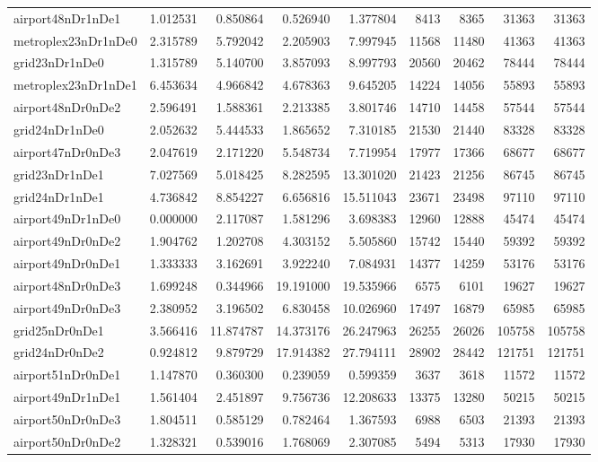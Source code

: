 \begin{longtable}{|l|r|r|r|r|r|r|r|r|}
airport48nDr1nDe1 & 1.012531 & 0.850864 & 0.526940 & 1.377804 & 8413 & 8365 & 31363 & 31363 \\
metroplex23nDr1nDe0 & 2.315789 & 5.792042 & 2.205903 & 7.997945 & 11568 & 11480 & 41363 & 41363 \\
grid23nDr1nDe0 & 1.315789 & 5.140700 & 3.857093 & 8.997793 & 20560 & 20462 & 78444 & 78444 \\
metroplex23nDr1nDe1 & 6.453634 & 4.966842 & 4.678363 & 9.645205 & 14224 & 14056 & 55893 & 55893 \\
airport48nDr0nDe2 & 2.596491 & 1.588361 & 2.213385 & 3.801746 & 14710 & 14458 & 57544 & 57544 \\
grid24nDr1nDe0 & 2.052632 & 5.444533 & 1.865652 & 7.310185 & 21530 & 21440 & 83328 & 83328 \\
airport47nDr0nDe3 & 2.047619 & 2.171220 & 5.548734 & 7.719954 & 17977 & 17366 & 68677 & 68677 \\
grid23nDr1nDe1 & 7.027569 & 5.018425 & 8.282595 & 13.301020 & 21423 & 21256 & 86745 & 86745 \\
grid24nDr1nDe1 & 4.736842 & 8.854227 & 6.656816 & 15.511043 & 23671 & 23498 & 97110 & 97110 \\
airport49nDr1nDe0 & 0.000000 & 2.117087 & 1.581296 & 3.698383 & 12960 & 12888 & 45474 & 45474 \\
airport49nDr0nDe2 & 1.904762 & 1.202708 & 4.303152 & 5.505860 & 15742 & 15440 & 59392 & 59392 \\
airport49nDr0nDe1 & 1.333333 & 3.162691 & 3.922240 & 7.084931 & 14377 & 14259 & 53176 & 53176 \\
airport48nDr0nDe3 & 1.699248 & 0.344966 & 19.191000 & 19.535966 & 6575 & 6101 & 19627 & 19627 \\
airport49nDr0nDe3 & 2.380952 & 3.196502 & 6.830458 & 10.026960 & 17497 & 16879 & 65985 & 65985 \\
grid25nDr0nDe1 & 3.566416 & 11.874787 & 14.373176 & 26.247963 & 26255 & 26026 & 105758 & 105758 \\
grid24nDr0nDe2 & 0.924812 & 9.879729 & 17.914382 & 27.794111 & 28902 & 28442 & 121751 & 121751 \\
airport51nDr0nDe1 & 1.147870 & 0.360300 & 0.239059 & 0.599359 & 3637 & 3618 & 11572 & 11572 \\
airport49nDr1nDe1 & 1.561404 & 2.451897 & 9.756736 & 12.208633 & 13375 & 13280 & 50215 & 50215 \\
airport50nDr0nDe3 & 1.804511 & 0.585129 & 0.782464 & 1.367593 & 6988 & 6503 & 21393 & 21393 \\
airport50nDr0nDe2 & 1.328321 & 0.539016 & 1.768069 & 2.307085 & 5494 & 5313 & 17930 & 17930 \\

\end{longtable}
